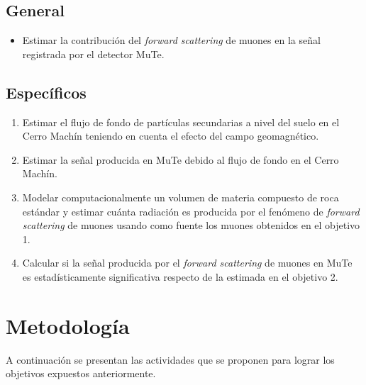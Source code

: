 \documentclass[12pt]{report}
\begin{document}
\subsection*{General}
\begin{itemize}
    \item Estimar la contribución del \textit{forward scattering} de muones en la señal registrada por el detector MuTe.
\end{itemize}

\subsection*{Específicos}
\begin{enumerate}
    \item Estimar el flujo de fondo de partículas secundarias a nivel del suelo en el Cerro Machín teniendo en cuenta el efecto del campo geomagnético.
    \item Estimar la señal producida en MuTe debido al flujo de fondo en el Cerro Machín.
    \item Modelar computacionalmente un volumen de materia compuesto de roca estándar y estimar cuánta radiación es producida por el fenómeno de \textit{forward scattering} de muones usando como fuente los muones obtenidos en el objetivo 1.
    \item Calcular si la señal producida por el \textit{forward scattering} de muones en MuTe es estadísticamente significativa respecto de la estimada en el objetivo 2.
\end{enumerate}

\section*{Metodología}

A continuación se presentan las actividades que se proponen para lograr los objetivos expuestos anteriormente.
\end{document}
